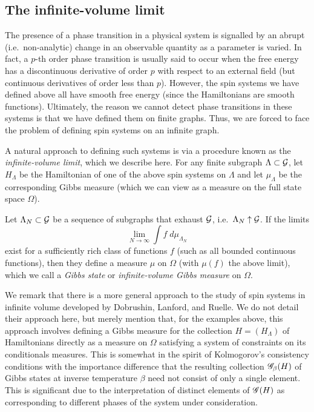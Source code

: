
\subsection{The infinite-volume limit}

The presence of a phase transition in a physical system is signalled by an abrupt (i.e.\ non-analytic) change in an observable quantity as a parameter is varied. In fact, a $p$-th order phase transition is usually said to occur when the free energy has a discontinuous derivative of order $p$ with respect to an external field (but continuous derivatives of order less than $p$). However, the spin systems we have defined above all have smooth free energy (since the Hamiltonians are smooth functions). Ultimately, the reason we cannot detect phase transitions in these systems is that we have defined them on finite graphs. Thus, we are forced to face the problem of defining spin systems on an infinite graph.

A natural approach to defining such systems is via a procedure known as the
\emph{infinite-volume limit}, which we describe here. For any
finite subgraph $\Lambda \subset \mathcal{G}$, let $H_\Lambda$ be the Hamiltonian
of one of the above spin systems on $\Lambda$ and let $\mu_\Lambda$ be the
corresponding Gibbs measure (which we can view as a measure on the full state
space $\Omega$).

Let $\Lambda_N \subset \mathcal{G}$ be a sequence of subgraphs that exhaust
$\mathcal{G}$, i.e.\ $\Lambda_N \uparrow \mathcal{G}$. If the limits
\begin{equation}
\lim_{N\to\infty} \int f \; d\mu_{\Lambda_N}
\end{equation}
exist for a sufficiently rich class of functions $f$ (such as all bounded continuous functions), then they define a measure $\mu$ on $\Omega$ (with $\mu(f)$ the above limit), which we call a \emph{Gibbs state} or
\emph{infinite-volume Gibbs measure} on $\Omega$.

We remark that there is a more general approach to the study of spin systems in infinite volume developed by Dobrushin, Lanford, and Ruelle. We do not detail their approach here, but merely mention that, for the examples above, this approach involves defining a Gibbs measure for the collection
$H = (H_\Lambda)$ of Hamiltonians directly as a measure on $\Omega$ satisfying a system of constraints on its conditionals measures. This is somewhat in the spirit of Kolmogorov's consistency conditions with the importance difference that the resulting collection $\mathscr{G}_\beta(H)$ of Gibbs states at inverse temperature
$\beta$ need not consist of only a single element. This is significant due to the interpretation of distinct elements of $\mathscr{G}(H)$ as corresponding to different phases of the system under consideration.

